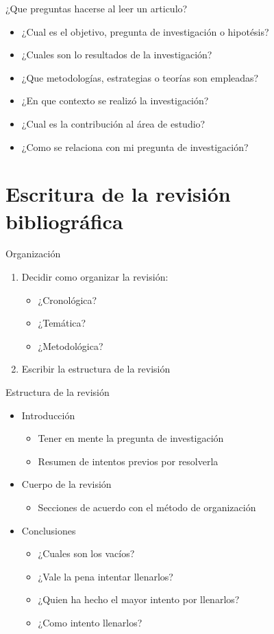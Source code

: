 \documentclass[
10pt,
aspectratio=169,
]{beamer}
\begin{document}
\begin{frame}[c]{¿Que preguntas hacerse al leer un articulo?}
\begin{itemize}
\item ¿Cual es el objetivo, pregunta de investigaci\'on o hipot\'esis?
\item ¿Cuales son lo resultados de la investigaci\'on?
\item ¿Que metodolog\'ias, estrategias o teor\'ias son empleadas?
\item ¿En que contexto se realiz\'o la investigaci\'on?
\item ¿Cual es la contribuci\'on al \'area de estudio?
\item ¿Como se relaciona con mi pregunta de investigaci\'on?
\end{itemize}
\end{frame}

\section{Escritura de la revisi\'on bibliogr\'afica}
\begin{frame}[c]{Organizaci\'on}
\begin{enumerate}
\item Decidir como organizar la revisi\'on:
\begin{itemize}
\item ¿Cronol\'ogica?
\item ¿Tem\'atica?
\item ¿Metodol\'ogica?
\end{itemize}
\item Escribir la estructura de la revisi\'on
\end{enumerate}
\end{frame}


\begin{frame}[c]{Estructura de la revisi\'on}
\begin{itemize}
\item Introducci\'on
\begin{itemize}
\item Tener en mente la pregunta de investigaci\'on
\item Resumen de intentos previos por resolverla
\end{itemize}
\item Cuerpo de la revisi\'on 
\begin{itemize}
\item Secciones de acuerdo con el m\'etodo de organizaci\'on
\end{itemize}
\item Conclusiones
\begin{itemize}
\item ¿Cuales son los vac\'ios?
\item ¿Vale la pena intentar llenarlos?
\item ¿Quien ha hecho el mayor intento por llenarlos?
\item ¿Como intento llenarlos?
\end{itemize}
\end{itemize}
\end{frame}
\end{document}
